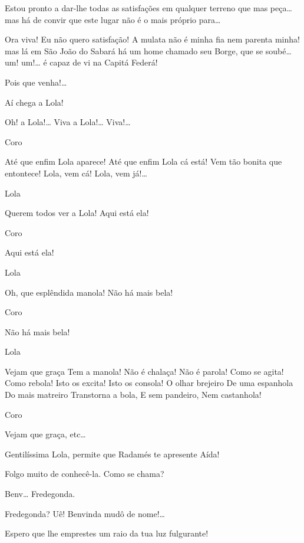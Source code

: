  Estou pronto a dar-lhe todas as satisfações em qualquer
terreno que mas peça\ldots{} mas há de convir que este lugar não é o mais próprio para\ldots{}

  Ora viva! Eu não quero satisfação! A mulata não é
minha fia nem parenta minha! mas lá em São João do Sabará há um home chamado seu
Borge, que se soubé\ldots{} um! um!\ldots{} é capaz de vi na Capitá Federá!

 Pois que venha!\ldots{}

 Aí chega a Lola!

 Oh! a Lola!\ldots{} Viva a Lola!\ldots{} Viva!\ldots{}


 Coro

 Até que enfim Lola aparece!
 Até que enfim Lola cá está!
 Vem tão bonita que entontece!
 Lola, vem cá! Lola, vem já!\ldots{}

\repl{} 

 Lola

 Querem todos ver a Lola!
 Aqui está ela!

 Coro

 Aqui está ela!

 Lola

 Oh, que esplêndida manola!
 Não há mais bela!

 Coro

 Não há mais bela!

 Lola

 Vejam que graça
 Tem a manola!
 Não é chalaça!
 Não é parola!
 Como se agita!
 Como rebola!
 Isto os excita!
 Isto os consola!
 O olhar brejeiro
 De uma espanhola
 Do mais matreiro
 Transtorna a bola,
 E sem pandeiro,
 Nem castanhola!

 Coro

 Vejam que graça, etc\ldots{} 

 Gentilíssima Lola, permite que Radamés te apresente Aída!

 Folgo muito de conhecê-la. Como se chama?

 Benv\ldots{}  Fredegonda.

  Fredegonda? Uê! Benvinda mudô de nome!\ldots{}

 Espero que lhe emprestes um raio da tua luz fulgurante!

